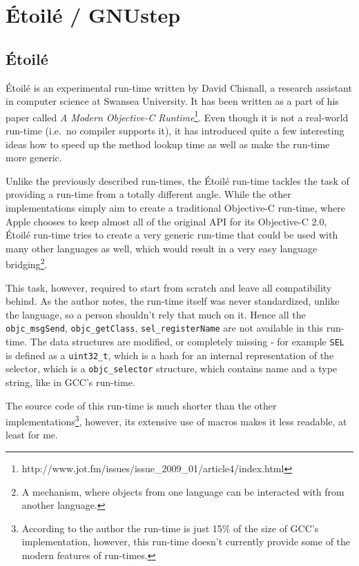 \chapter{\'Etoil\'e / GNUstep}
\section{\'Etoil\'e}

\'Etoil\'e is an experimental run-time written by David Chisnall, a research assistant in computer science at Swansea University. It has been written as a part of his paper called \emph{A Modern Objective-C Runtime}\footnote{http://www.jot.fm/issues/issue\_2009\_01/article4/index.html}. Even though it is not a real-world run-time (i.e.\ no compiler supports it), it has introduced quite a few interesting ideas how to speed up the method lookup time as well as make the run-time more generic.

Unlike the previously described run-times, the \'Etoil\'e run-time tackles the task of providing a run-time from a totally different angle. While the other implementations simply aim to create a traditional Objective-C run-time, where Apple chooses to keep almost all of the original API for its Objective-C 2.0, \'Etoil\'e run-time tries to create a very generic run-time that could be used with many other languages as well, which would result in a very easy language bridging\footnote{A mechanism, where objects from one language can be interacted with from another language.}.

This task, however, required to start from scratch and leave all compatibility behind. As the author notes, the run-time itself was never standardized, unlike the language, so a person shouldn't rely that much on it. Hence all the \verb=objc_msgSend=, \verb=objc_getClass=, \verb=sel_registerName= are not available in this run-time. The data structures are modified, or completely missing - for example \verb=SEL= is defined as a \verb=uint32_t=, which is a hash for an internal representation of the selector, which is a \verb=objc_selector= structure, which contains name and a type string, like in GCC's run-time. 

The source code of this run-time is much shorter than the other implementations\footnote{According to the author the run-time is just 15\% of the size of GCC's implementation, however, this run-time doesn't currently provide some of the modern features of run-times.}, however, its extensive use of macros makes it less readable, at least for me.

